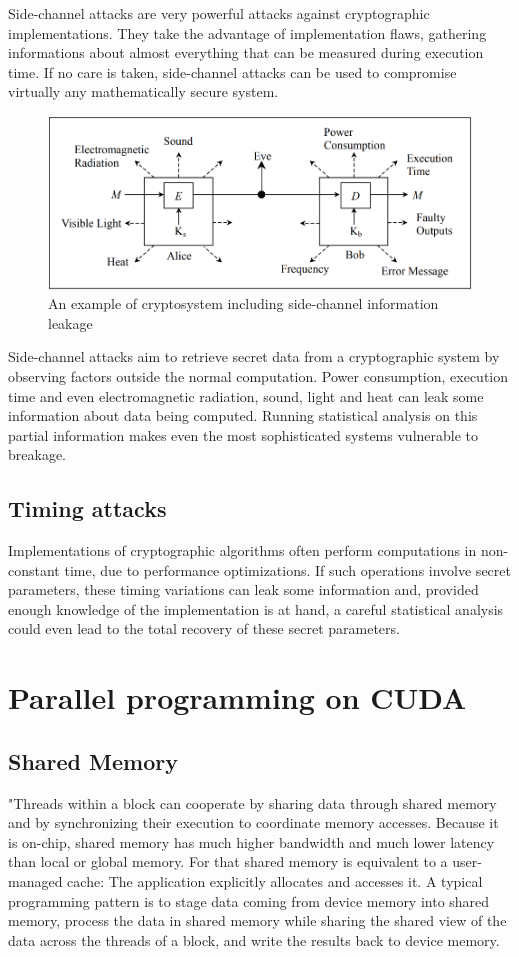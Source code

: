 \documentclass[oneside,openright,12pt,final,en]{mgr}
\begin{document}
Side-channel attacks are very powerful attacks against cryptographic implementations. They take the advantage of implementation flaws, gathering informations about almost everything that can be measured during execution time. If no care is taken, side-channel attacks can be used to compromise virtually any mathematically secure system. 
\begin{figure}[H]
	\centering
	\includegraphics{sidechannel}
	\caption{An example of cryptosystem including side-channel information leakage}
	\label{fig:sidechannel}
\end{figure}

Side-channel attacks aim to retrieve secret data from a cryptographic system by observing factors outside the normal computation. Power consumption, execution time and even electromagnetic radiation, sound, light and heat can leak some information about data being computed. Running statistical analysis on this partial information makes even the most sophisticated systems vulnerable to breakage. 


\subsection{Timing attacks}

Implementations of cryptographic algorithms often perform computations in non-constant
time, due to performance optimizations. If such operations involve secret parameters, these timing
variations can leak some information and, provided enough knowledge of the implementation is at
hand, a careful statistical analysis could even lead to the total recovery of these secret parameters.\cite{sc} 

\section{Parallel programming on CUDA}

\subsection{Shared Memory}
"Threads within a block can cooperate by sharing data through shared memory and by synchronizing their execution to coordinate memory accesses. Because it is on-chip, shared memory has much higher bandwidth and much lower latency than local or global memory. For that shared memory is equivalent to a user-managed cache: The application explicitly allocates and accesses it. A typical programming pattern is to stage data coming from device memory into shared memory, process the data in shared memory while sharing the shared view of the data across the threads of a block, and write the results back to device memory.
\end{document}
